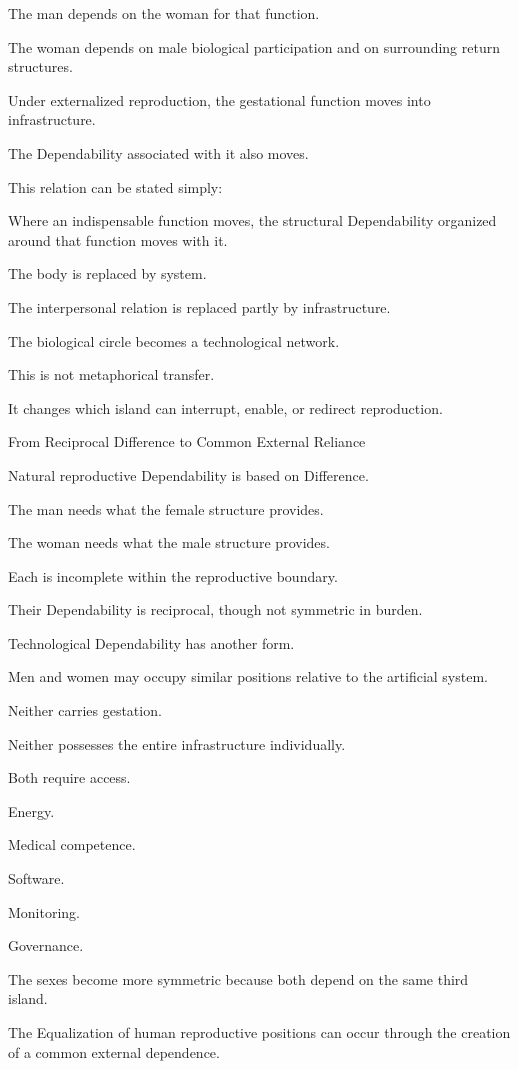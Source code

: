 The man depends on the woman for that function.

The woman depends on male biological participation and on surrounding return structures.

Under externalized reproduction, the gestational function moves into infrastructure.

The Dependability associated with it also moves.

This relation can be stated simply:

Where an indispensable function moves, the structural Dependability organized around that function moves with it.

The body is replaced by system.

The interpersonal relation is replaced partly by infrastructure.

The biological circle becomes a technological network.

This is not metaphorical transfer.

It changes which island can interrupt, enable, or redirect reproduction.

From Reciprocal Difference to Common External Reliance

Natural reproductive Dependability is based on Difference.

The man needs what the female structure provides.

The woman needs what the male structure provides.

Each is incomplete within the reproductive boundary.

Their Dependability is reciprocal, though not symmetric in burden.

Technological Dependability has another form.

Men and women may occupy similar positions relative to the artificial system.

Neither carries gestation.

Neither possesses the entire infrastructure individually.

Both require access.

Energy.

Medical competence.

Software.

Monitoring.

Governance.

The sexes become more symmetric because both depend on the same third island.

The Equalization of human reproductive positions can occur through the creation of a common external dependence.

